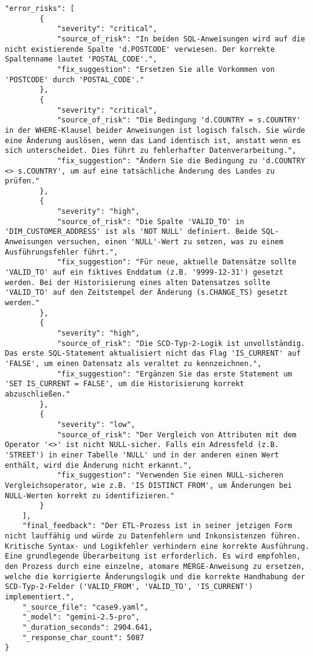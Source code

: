 \begin{lstlisting}[caption={Ausgabe: GEMINI 2.5 Pro Anwendungsfall 9 Robustheitsdurchlauf},label={gemini_case9_prompt3}]
    "error_risks": [
        {
            "severity": "critical",
            "source_of_risk": "In beiden SQL-Anweisungen wird auf die nicht existierende Spalte 'd.POSTCODE' verwiesen. Der korrekte Spaltenname lautet 'POSTAL_CODE'.",
            "fix_suggestion": "Ersetzen Sie alle Vorkommen von 'POSTCODE' durch 'POSTAL_CODE'."
        },
        {
            "severity": "critical",
            "source_of_risk": "Die Bedingung 'd.COUNTRY = s.COUNTRY' in der WHERE-Klausel beider Anweisungen ist logisch falsch. Sie würde eine Änderung auslösen, wenn das Land identisch ist, anstatt wenn es sich unterscheidet. Dies führt zu fehlerhafter Datenverarbeitung.",
            "fix_suggestion": "Ändern Sie die Bedingung zu 'd.COUNTRY <> s.COUNTRY', um auf eine tatsächliche Änderung des Landes zu prüfen."
        },
        {
            "severity": "high",
            "source_of_risk": "Die Spalte 'VALID_TO' in 'DIM_CUSTOMER_ADDRESS' ist als 'NOT NULL' definiert. Beide SQL-Anweisungen versuchen, einen 'NULL'-Wert zu setzen, was zu einem Ausführungsfehler führt.",
            "fix_suggestion": "Für neue, aktuelle Datensätze sollte 'VALID_TO' auf ein fiktives Enddatum (z.B. '9999-12-31') gesetzt werden. Bei der Historisierung eines alten Datensatzes sollte 'VALID_TO' auf den Zeitstempel der Änderung (s.CHANGE_TS) gesetzt werden."
        },
        {
            "severity": "high",
            "source_of_risk": "Die SCD-Typ-2-Logik ist unvollständig. Das erste SQL-Statement aktualisiert nicht das Flag 'IS_CURRENT' auf 'FALSE', um einen Datensatz als veraltet zu kennzeichnen.",
            "fix_suggestion": "Ergänzen Sie das erste Statement um 'SET IS_CURRENT = FALSE', um die Historisierung korrekt abzuschließen."
        },
        {
            "severity": "low",
            "source_of_risk": "Der Vergleich von Attributen mit dem Operator '<>' ist nicht NULL-sicher. Falls ein Adressfeld (z.B. 'STREET') in einer Tabelle 'NULL' und in der anderen einen Wert enthält, wird die Änderung nicht erkannt.",
            "fix_suggestion": "Verwenden Sie einen NULL-sicheren Vergleichsoperator, wie z.B. 'IS DISTINCT FROM', um Änderungen bei NULL-Werten korrekt zu identifizieren."
        }
    ],
    "final_feedback": "Der ETL-Prozess ist in seiner jetzigen Form nicht lauffähig und würde zu Datenfehlern und Inkonsistenzen führen. Kritische Syntax- und Logikfehler verhindern eine korrekte Ausführung. Eine grundlegende Überarbeitung ist erforderlich. Es wird empfohlen, den Prozess durch eine einzelne, atomare MERGE-Anweisung zu ersetzen, welche die korrigierte Änderungslogik und die korrekte Handhabung der SCD-Typ-2-Felder ('VALID_FROM', 'VALID_TO', 'IS_CURRENT') implementiert.",
    "_source_file": "case9.yaml",
    "_model": "gemini-2.5-pro",
    "_duration_seconds": 2904.641,
    "_response_char_count": 5087
}
\end{lstlisting}

